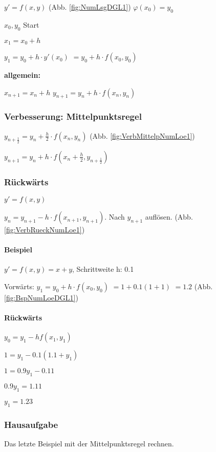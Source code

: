 $y' = f(x,y) $ (Abb. \ref{fig:NumLsgDGL1})
$\varphi(x_0) = y_0$

$x_0, y_0$ Start

$x_1 = x_0 + h$

$y_1 = y_0 + h \cdot y'(x_0)$
$=y_0 + h\cdot f(x_0,y_0)$

\textbf{allgemein:}

$x_{n+1} = x_n + h$
$y_{n+1} = y_n + h\cdot f(x_n,y_n)$

\subsubsection{Verbesserung: Mittelpunktsregel}
$y_{n+\frac{1}{2}} = y_n + \frac{h}{2} \cdot f(x_n, y_n)$ (Abb. \ref{fig:VerbMittelpNumLoe1})

$y_{n+1} = y_n + h \cdot f(x_n+\frac{h}{2}, y_{n+\frac{1}{2}})$

\subsubsection{Rückwärts}
$y' = f(x,y)$

$y_n = y_{n+1} - h \cdot f(x_{n+1}, y_{n+1})$. Nach $y_{n+1}$ auflösen. (Abb. \ref{fig:VerbRueckNumLoe1})

\paragraph{Beispiel}
$y' = f(x,y) = x+y$, Schrittweite h: 0.1

Vorwärts: $y_1 = y_0 + h \cdot f(x_0, y_0)$
$=1+0.1 (1+1)$
$=1.2$ (Abb. \ref{fig:BspNumLoeDGL1})

\paragraph{Rückwärts}
$y_0 = y_1 - h f(x_1,y_1)$

$1 = y_1 - 0.1 (1.1+y_1)$

$1 = 0.9 y_1 - 0.11 $

$0.9 y_1 = 1.11$

$y_1 = 1.23$

\subsubsection{Hausaufgabe}
Das letzte Beispiel mit der Mittelpunktsregel rechnen. 